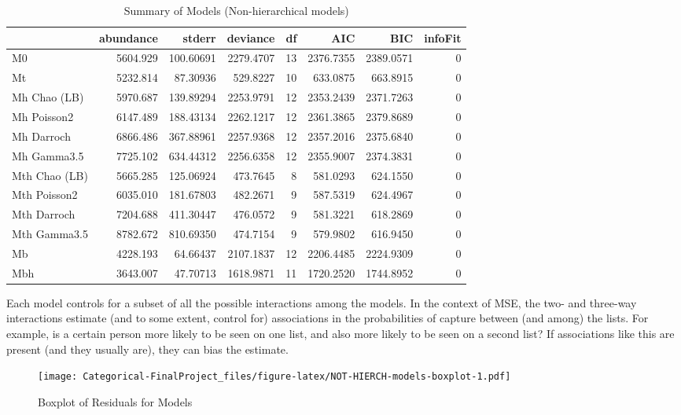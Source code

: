 \documentclass[]{article}
\begin{document}
\begin{table}[H]

\caption{\label{tab:NOT-HIERCH-models}Summary of Models (Non-hierarchical models)}
\centering
\begin{tabular}{lrrrrrrr}
\toprule
  & abundance & stderr & deviance & df & AIC & BIC & infoFit\\
\midrule
M0 & 5604.929 & 100.60691 & 2279.4707 & 13 & 2376.7355 & 2389.0571 & 0\\
Mt & 5232.814 & 87.30936 & 529.8227 & 10 & 633.0875 & 663.8915 & 0\\
Mh Chao (LB) & 5970.687 & 139.89294 & 2253.9791 & 12 & 2353.2439 & 2371.7263 & 0\\
Mh Poisson2 & 6147.489 & 188.43134 & 2262.1217 & 12 & 2361.3865 & 2379.8689 & 0\\
Mh Darroch & 6866.486 & 367.88961 & 2257.9368 & 12 & 2357.2016 & 2375.6840 & 0\\
\addlinespace
Mh Gamma3.5 & 7725.102 & 634.44312 & 2256.6358 & 12 & 2355.9007 & 2374.3831 & 0\\
Mth Chao (LB) & 5665.285 & 125.06924 & 473.7645 & 8 & 581.0293 & 624.1550 & 0\\
Mth Poisson2 & 6035.010 & 181.67803 & 482.2671 & 9 & 587.5319 & 624.4967 & 0\\
Mth Darroch & 7204.688 & 411.30447 & 476.0572 & 9 & 581.3221 & 618.2869 & 0\\
Mth Gamma3.5 & 8782.672 & 810.69350 & 474.7154 & 9 & 579.9802 & 616.9450 & 0\\
\addlinespace
Mb & 4228.193 & 64.66437 & 2107.1837 & 12 & 2206.4485 & 2224.9309 & 0\\
Mbh & 3643.007 & 47.70713 & 1618.9871 & 11 & 1720.2520 & 1744.8952 & 0\\
\bottomrule
\end{tabular}
\end{table}

Each model controls for a subset of all the possible interactions among
the models. In the context of MSE, the two- and three-way interactions
estimate (and to some extent, control for) associations in the
probabilities of capture between (and among) the lists. For example, is
a certain person more likely to be seen on one list, and also more
likely to be seen on a second list? If associations like this are
present (and they usually are), they can bias the estimate.

\begin{figure}
\centering
\texttt{[image: Categorical-FinalProject\_files/figure-latex/NOT-HIERCH-models-boxplot-1.pdf]}
\caption{Boxplot of Residuals for Models}
\end{figure}
\end{document}
